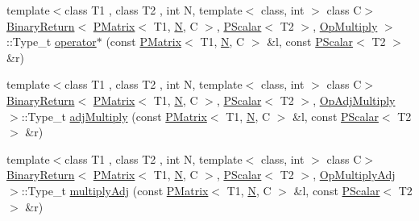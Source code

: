 \begin{DoxyCompactItemize}
\item 
{\footnotesize template$<$class T1 , class T2 , int N, template$<$ class, int $>$ class C$>$ }\\\mbox{\hyperlink{structENSEM_1_1BinaryReturn}{Binary\+Return}}$<$ \mbox{\hyperlink{classENSEM_1_1PMatrix}{P\+Matrix}}$<$ T1, \mbox{\hyperlink{operator__name__util_8cc_a7722c8ecbb62d99aee7ce68b1752f337}{N}}, C $>$, \mbox{\hyperlink{classENSEM_1_1PScalar}{P\+Scalar}}$<$ T2 $>$, \mbox{\hyperlink{structENSEM_1_1OpMultiply}{Op\+Multiply}} $>$\+::Type\+\_\+t \mbox{\hyperlink{group__primmatrix_ga9edd8305793268c1fbc1b874baa000d3}{operator$\ast$}} (const \mbox{\hyperlink{classENSEM_1_1PMatrix}{P\+Matrix}}$<$ T1, \mbox{\hyperlink{operator__name__util_8cc_a7722c8ecbb62d99aee7ce68b1752f337}{N}}, C $>$ \&l, const \mbox{\hyperlink{classENSEM_1_1PScalar}{P\+Scalar}}$<$ T2 $>$ \&r)
\item 
{\footnotesize template$<$class T1 , class T2 , int N, template$<$ class, int $>$ class C$>$ }\\\mbox{\hyperlink{structENSEM_1_1BinaryReturn}{Binary\+Return}}$<$ \mbox{\hyperlink{classENSEM_1_1PMatrix}{P\+Matrix}}$<$ T1, \mbox{\hyperlink{operator__name__util_8cc_a7722c8ecbb62d99aee7ce68b1752f337}{N}}, C $>$, \mbox{\hyperlink{classENSEM_1_1PScalar}{P\+Scalar}}$<$ T2 $>$, \mbox{\hyperlink{structENSEM_1_1OpAdjMultiply}{Op\+Adj\+Multiply}} $>$\+::Type\+\_\+t \mbox{\hyperlink{group__primmatrix_ga47a69844104af73a48b189fb08811b87}{adj\+Multiply}} (const \mbox{\hyperlink{classENSEM_1_1PMatrix}{P\+Matrix}}$<$ T1, \mbox{\hyperlink{operator__name__util_8cc_a7722c8ecbb62d99aee7ce68b1752f337}{N}}, C $>$ \&l, const \mbox{\hyperlink{classENSEM_1_1PScalar}{P\+Scalar}}$<$ T2 $>$ \&r)
\item 
{\footnotesize template$<$class T1 , class T2 , int N, template$<$ class, int $>$ class C$>$ }\\\mbox{\hyperlink{structENSEM_1_1BinaryReturn}{Binary\+Return}}$<$ \mbox{\hyperlink{classENSEM_1_1PMatrix}{P\+Matrix}}$<$ T1, \mbox{\hyperlink{operator__name__util_8cc_a7722c8ecbb62d99aee7ce68b1752f337}{N}}, C $>$, \mbox{\hyperlink{classENSEM_1_1PScalar}{P\+Scalar}}$<$ T2 $>$, \mbox{\hyperlink{structENSEM_1_1OpMultiplyAdj}{Op\+Multiply\+Adj}} $>$\+::Type\+\_\+t \mbox{\hyperlink{group__primmatrix_ga1635949cdf21523d1c8bdb6d5ada65a8}{multiply\+Adj}} (const \mbox{\hyperlink{classENSEM_1_1PMatrix}{P\+Matrix}}$<$ T1, \mbox{\hyperlink{operator__name__util_8cc_a7722c8ecbb62d99aee7ce68b1752f337}{N}}, C $>$ \&l, const \mbox{\hyperlink{classENSEM_1_1PScalar}{P\+Scalar}}$<$ T2 $>$ \&r)
\item 

\end{DoxyCompactItemize}
